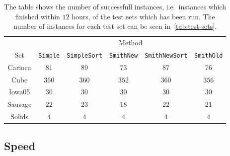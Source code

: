\begin{table}[htbp]
  \centering
  \begin{tabular}{cccccc}
    \toprule
            & \multicolumn{5}{c}{Method}                               \\
    \cmidrule(l){2-6}
    Set     & \texttt{Simple} 
            & \texttt{SimpleSort}
            & \texttt{SmithNew} 
            & \texttt{SmithNewSort}
            & \texttt{SmithOld}                                        \\
    \cmidrule(r){1-1}\cmidrule(l){2-6}
    Carioca & $81$   & $89$       & $73$     & $87$         & $76$     \\
    Cube    & $360$  & $360$      & $352$    & $360$        & $356$    \\
    Iowa05  & $30$   & $30$       & $30$     & $30$         & $30$     \\
    Sausage & $22$   & $23$       & $18$     & $22$         & $21$     \\
    Solids  & $4$    & $4$        & $4$      & $4$          & $4$      \\
    \bottomrule
  \end{tabular}
  \caption[Successfull test runs]{The table shows the number of successfull
    instances, i.e.\ instances which finished within $12$ hours, of the test
    sets which has been run. The number of instances for each test set can be
    seen in~\cref{tab:test-sets}.\label{tab:set-success}}
\end{table}

\subsection{Speed}
\label{sec:speed}

